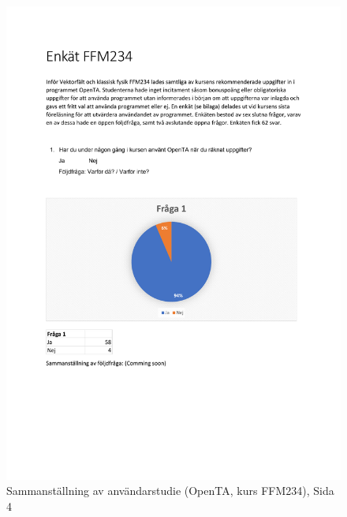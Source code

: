\begin{figure}[hbtp]
    \centering
    \includegraphics[page=4,scale=0.85]{appendix/form_survey.pdf}
    \caption*{Sammanställning av användarstudie (OpenTA, kurs FFM234), Sida 4}
    \label{fig:openform4}
\end{figure}

